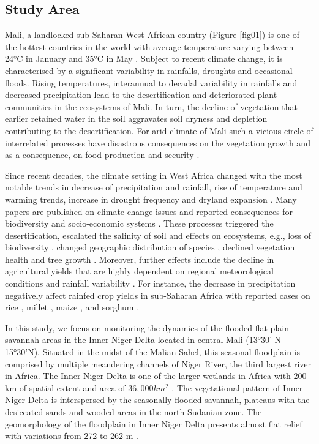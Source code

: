 \documentclass[remotesensing,article,submit,pdftex,moreauthors]{Definitions/mdpi}
\begin{document}
\subsection{Study Area}

Mali, a landlocked sub-Saharan West African country (Figure \ref{fig01}) is one of the hottest countries in the world with average temperature varying between 24°C in January and 35°C in May \cite{CCKP}. Subject to recent climate change, it is characterised by a significant variability in rainfalls, droughts and occasional floods. Rising temperatures, interannual to decadal variability in rainfalls and decreased precipitation lead to the desertification and deteriorated plant communities in the ecosystems of Mali. In turn, the decline of vegetation that earlier retained water in the soil aggravates soil dryness and depletion contributing to the desertification. For arid climate of Mali such a vicious circle of interrelated processes have disastrous consequences on the vegetation growth and as a consequence, on food production and security \cite{Davies1996}. 

Since recent decades, the climate setting in West Africa changed with the most notable trends in decrease of precipitation and rainfall, rise of temperature and warming trends, increase in drought frequency and dryland expansion \cite{LEALFILHO202283,OGUNTUNDE2017121,OGUNTUNDE20061180,SIDIBE2019141}. Many papers are published on climate change issues and reported consequences for biodiversity and socio-economic systems \cite{LEHOUEROU1996133,Huang,Yu}. These processes triggered the desertification, escalated the salinity of soil and effects on ecosystems, e.g., loss of biodiversity \cite{HEUBES201348}, changed geographic distribution of species \cite{COULIBALY2023100359}, declined vegetation health and tree growth \cite{SANOGO2022100333}. Moreover, further effects include the
decline in agricultural yields that are highly dependent on regional meteorological conditions and rainfall variability \cite{Zare}. For instance, the decrease in precipitation negatively affect rainfed crop yields in sub-Saharan Africa \cite{RAES2021108563,BAMBIO2022102288} with reported cases on rice \cite{AKPOTI2022103429,ADJAH2022512}, millet \cite{BADO2022107992}, maize \cite{SRIVASTAVA201610}, and sorghum \cite{ADAM2020102920}.

In this study, we focus on monitoring the dynamics of the flooded flat plain savannah areas in the Inner Niger Delta located in central Mali (13°30' N--15°30'N). Situated in the midst of the Malian Sahel, this seasonal floodplain is comprised by multiple meandering channels of Niger River, the third largest river in Africa. The Inner Niger Delta is one of the larger wetlands in Africa with 200 km of spatial extent and area of $36,000 km^2$ \cite{KUPER200383}. The vegetational pattern of Inner Niger Delta is interspersed by the seasonally flooded savannah, plateaus with the desiccated sands and wooded areas in the north-Sudanian zone. The geomorphology of the floodplain in Inner Niger Delta presents almost flat relief with variations from 272 to 262 m \cite{Gallais2003}. 
\end{document}
